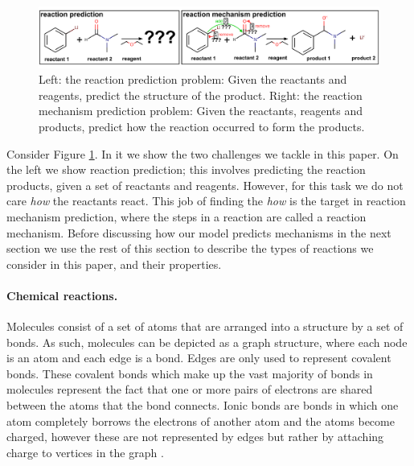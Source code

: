 

\begin{figure}[h]
\centering
\includegraphics[width=\textwidth]{reaction_diagram}
\caption{Left: the reaction prediction problem: Given the reactants and reagents, predict the structure of the product. Right: the reaction mechanism prediction problem: Given the reactants, reagents and products, predict how the reaction occurred to form the products.}
\label{fig:task-overview}
\end{figure}


Consider Figure \ref{fig:task-overview}. In it we show the two challenges we tackle in this paper. 
On the left we show reaction prediction; this involves predicting the reaction products, given a set of reactants and reagents. However, for this task we do not care {\em how} the reactants react.
 This job of finding the {\em how} is the target in reaction mechanism prediction, where the steps in a reaction are called a reaction mechanism.
 Before discussing how our model predicts mechanisms in the next section we use the rest of this section to describe the types of reactions we consider in this paper, and their properties.

\paragraph{Chemical reactions.}

Molecules consist of a set of atoms that are arranged into a structure by a set of bonds. 
As such, molecules can be depicted as a graph structure, where each node is an atom and each edge is a bond.
Edges are only used to represent covalent bonds. 
These covalent bonds which make up the vast majority of bonds in molecules  represent the fact that one or more pairs of electrons are shared between the atoms that the bond connects. 
 Ionic bonds are bonds in which one atom completely borrows the electrons of another atom and the atoms become charged, however these are not represented by edges but rather by attaching charge to vertices in the graph .

